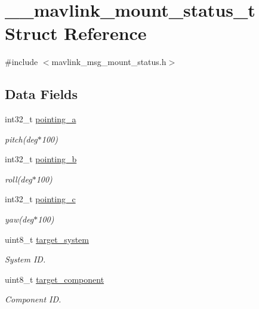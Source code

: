 \hypertarget{struct____mavlink__mount__status__t}{\section{\+\_\+\+\_\+mavlink\+\_\+mount\+\_\+status\+\_\+t Struct Reference}
\label{struct____mavlink__mount__status__t}
}


{\ttfamily \#include $<$mavlink\+\_\+msg\+\_\+mount\+\_\+status.\+h$>$}

\subsection*{Data Fields}
\begin{DoxyCompactItemize}
\item 
int32\+\_\+t \hyperlink{struct____mavlink__mount__status__t_a958609d0de4696073d29c044f3c88202}{pointing\+\_\+a}
\begin{DoxyCompactList}\small\item\em pitch(deg$\ast$100) \end{DoxyCompactList}\item 
int32\+\_\+t \hyperlink{struct____mavlink__mount__status__t_abc312db5ff3a5620ca0c345ee5253f0f}{pointing\+\_\+b}
\begin{DoxyCompactList}\small\item\em roll(deg$\ast$100) \end{DoxyCompactList}\item 
int32\+\_\+t \hyperlink{struct____mavlink__mount__status__t_a28ca0af4b0189520b746060147f6608c}{pointing\+\_\+c}
\begin{DoxyCompactList}\small\item\em yaw(deg$\ast$100) \end{DoxyCompactList}\item 
uint8\+\_\+t \hyperlink{struct____mavlink__mount__status__t_a22c9048f29da5622b7c97edfd5801ac9}{target\+\_\+system}
\begin{DoxyCompactList}\small\item\em System I\+D. \end{DoxyCompactList}\item 
uint8\+\_\+t \hyperlink{struct____mavlink__mount__status__t_a101b36e939ec924ce415e80e9b0d8f1e}{target\+\_\+component}
\begin{DoxyCompactList}\small\item\em Component I\+D. \end{DoxyCompactList}\end{DoxyCompactItemize}



